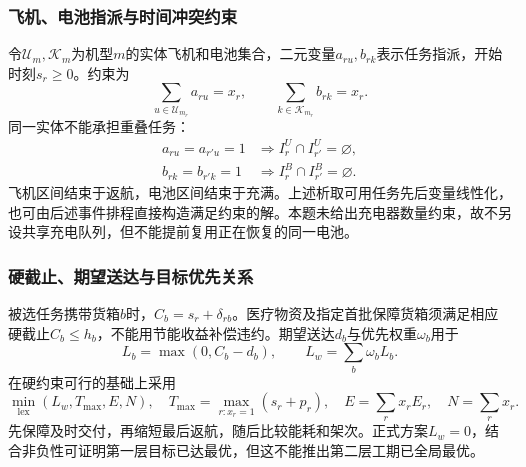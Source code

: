 \documentclass[withoutpreface,colorprint]{format}
\numberwithin{equation}{section}
\numberwithin{figure}{section}
\numberwithin{table}{section}
\begin{document}
\subsubsection{飞机、电池指派与时间冲突约束}
令$\mathcal U_m,\mathcal K_m$为机型$m$的实体飞机和电池集合，二元变量$a_{ru},b_{rk}$表示任务指派，开始时刻$s_r\ge0$。约束为
\begin{equation}
 \sum_{u\in\mathcal U_{m_r}}a_{ru}=x_r,\qquad
 \sum_{k\in\mathcal K_{m_r}}b_{rk}=x_r.
\label{eq:q2_assignment}
\end{equation}
同一实体不能承担重叠任务：
\begin{equation}
\begin{aligned}
 a_{ru}=a_{r'u}=1&\Rightarrow I_r^U\cap I_{r'}^U=\varnothing,\\
 b_{rk}=b_{r'k}=1&\Rightarrow I_r^B\cap I_{r'}^B=\varnothing.
\end{aligned}
\label{eq:q2_disjoint}
\end{equation}
飞机区间结束于返航，电池区间结束于充满。上述析取可用任务先后变量线性化，也可由后述事件排程直接构造满足约束的解。本题未给出充电器数量约束，故不另设共享充电队列，但不能提前复用正在恢复的同一电池。

\subsubsection{硬截止、期望送达与目标优先关系}
被选任务携带货箱$b$时，$C_b=s_r+\delta_{rb}$。医疗物资及指定首批保障货箱须满足相应硬截止$C_b\le h_b$，不能用节能收益补偿违约。期望送达$d_b$与优先权重$\omega_b$用于
\begin{equation}
 L_b=\max(0,C_b-d_b),\qquad L_w=\sum_b\omega_bL_b.
\label{eq:q2_tardiness}
\end{equation}
在硬约束可行的基础上采用
\begin{equation}
 \min_{\mathrm{lex}}(L_w,T_{\max},E,N),\quad
 T_{\max}=\max_{r:x_r=1}(s_r+p_r),\quad E=\sum_rx_rE_r,\quad N=\sum_rx_r.
\label{eq:q2_objective}
\end{equation}
先保障及时交付，再缩短最后返航，随后比较能耗和架次。正式方案$L_w=0$，结合非负性可证明第一层目标已达最优，但这不能推出第二层工期已全局最优。
\end{document}
